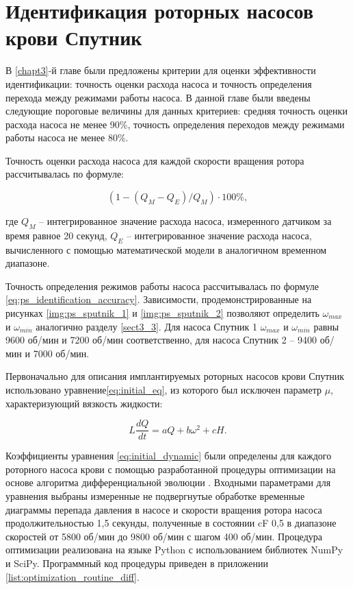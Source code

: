 \section{Идентификация роторных насосов крови Спутник}

В \ref{chapt3}-й главе были предложены критерии для оценки эффективности идентификации: точность оценки расхода насоса и точность определения перехода между режимами работы насоса. В данной главе были введены следующие пороговые величины для данных критериев: средняя точность оценки расхода насоса не менее 90\%, точность определения переходов между режимами работы насоса не менее 80\%.

Точность оценки расхода насоса для каждой скорости вращения ротора рассчитывалась по формуле:

\begin{equation}
	\left( 1 - (Q_M - Q_E)/Q_M \right) \cdot 100 \%,
\end{equation}

\noindent где $Q_M$ -- интегрированное значение расхода насоса, измеренного датчиком за время равное 20 секунд, $Q_E$ -- интегрированное значение расхода насоса, вычисленного с помощью математической модели в аналогичном временном диапазоне.  

Точность определения режимов работы насоса рассчитывалась по формуле \eqref{eq:ps_identification_accuracy}. Зависимости, продемонстрированные на рисунках \ref{img:ps_sputnik_1} и \ref{img:ps_sputnik_2} позволяют определить $\omega_{max}$ и $\omega_{min}$ аналогично разделу \ref{sect3_3}. Для насоса Спутник 1 $\omega_{max}$ и $\omega_{min}$ равны 9600 об/мин и 7200 об/мин соответственно, для насоса Спутник 2 -- 9400 об/мин и 7000 об/мин.

Первоначально для описания имплантируемых роторных насосов крови Спутник использовано уравнение\eqref{eq:initial_eq}, из которого был исключен параметр $\mu$, характеризующий вязкость жидкости:

\begin{equation}
	\label{eq:initial_dynamic}
	L\frac{dQ}{dt} = aQ + b\omega^2 + cH.
\end{equation}

Коэффициенты уравнения \eqref{eq:initial_dynamic} были определены для каждого роторного насоса крови с помощью разработанной процедуры оптимизации на основе алгоритма дифференциальной эволюции \cite{storn1997differential,price2006differential}. Входными параметрами для уравнения выбраны измеренные не подвергнутые обработке временные диаграммы перепада давления в насосе и скорости вращения ротора насоса продолжительностью 1,5 секунды, полученные в состоянии cF 0,5 в диапазоне скоростей от 5800 об/мин до 9800 об/мин с шагом 400 об/мин. Процедура оптимизации реализована на языке Python с использованием библиотек NumPy и SciPy. Программный код процедуры приведен в приложении \ref{list:optimization_routine_diff}. 

